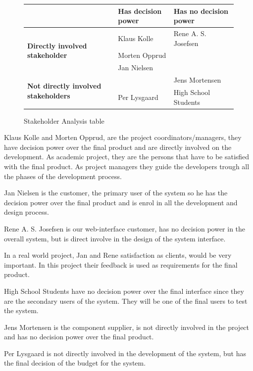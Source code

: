 \begin{figure}[h!]
 \begin{center}
  \begin{tabular}{| l | l | l |}
   \hline
    & \textbf{Has decision power} & \textbf{Has no decision power} \\ \hline
    \multirow{3}{*}{\textbf{Directly involved stakeholder}} 
    	& Klaus Kolle & Rene A. S. Josefsen\\ 
    	& Morten Opprud &  \\ 
    	& Jan Nielsen &  \\ \hline
    \multirow{2}{*}{\textbf{Not directly involved stakeholders}} 
    	&  & Jens Mortensen\\
    	& Per Lysgaard & High School Students \\ \hline
   \end{tabular}
  \end{center}
 \caption{Stakeholder Analysis table}
\end{figure}

Klaus Kolle and Morten Opprud, are the project coordinators/managers, they
have decision power over the final product and are directly involved on the development. As academic project, they are the persons that have to be satisfied with the final product. As project managers they guide the developers trough all the phases of the development process.\p

Jan Nielsen is the customer, the primary user of the system so he has the decision power over the final product and is enrol in all the development and design process. \p

Rene A. S. Josefsen is our web-interface customer, has no decision power in the overall system, but is direct involve in the design of the system interface.\p

In a real world project, Jan and Rene satisfaction as clients, would be very important. In this project their feedback is used as requirements for the final product.\p 

High School Students have no decision power over the final interface since they are the secondary users of the system. They will be one of the final users to test the system.\p

Jens Mortensen is the component supplier, is not directly involved in the project and has no decision power over the final product.\p

Per Lysgaard is not directly involved in the development of the system, but has the final decision of the budget for the system.\p

